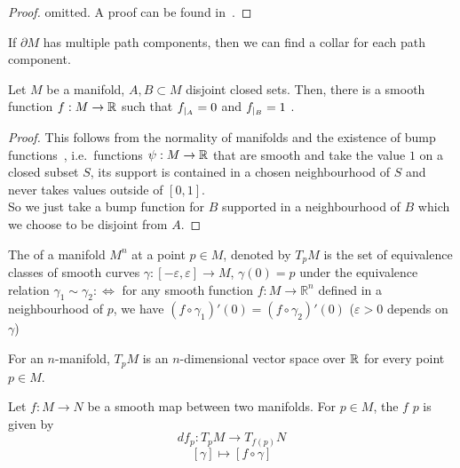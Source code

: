 \documentclass[a4paper,11pt]{article}
\begin{document}
\begin{proof}
    omitted. A proof can be found in\ \cite{lee}.
\end{proof}

\begin{observation}
    If \(\partial M\) has multiple path components, then we can find a collar for each path component.
\end{observation}

\begin{theorem}\label{urysohn}
    Let \(M\) be a manifold, \(A,B\subset M\) disjoint closed sets. Then, there is a smooth function \(f:M\to\mathbb{R}\) such that \(f_{|_{A}}=0\) and \(f_{|_{B}}=1\)
.
\end{theorem}

\begin{proof}
    This follows from the normality of manifolds and the existence of bump functions\ \cite[Proposition 2.25]{lee}, i.e.\ functions \(\psi:M\to\mathbb{R}\) that are smooth and take the value \(1\) on a closed subset \(S\), its support is contained in a chosen neighbourhood of \(S\) and never takes values outside of \([0,1]\).\\
    So we just take a bump function for \(B\) supported in a neighbourhood of \(B\) which we choose to be disjoint from \(A\).
\end{proof}

\begin{definition}
    The  of a manifold \(M^n\) at a point \(p\in M\), denoted by \(T_p M\) is the set of equivalence classes of smooth curves \(\gamma:[-\varepsilon,\varepsilon]\to M\), \(\gamma(0)=p\) under the equivalence relation \(\gamma_1\sim\gamma_2:\Leftrightarrow\) for any smooth function \(f:M\to\mathbb{R}^n\) defined in a neighbourhood of \(p\), we have \((f\circ\gamma_1)'(0)=(f\circ\gamma_2)'(0)\) (\(\varepsilon>0\) depends on \(\gamma\))
\end{definition}

\begin{remark}\cite[Proposition 3.10]{lee}
    For an \(n\)-manifold, \(T_p M\) is an \(n\)-dimensional vector space over \(\mathbb{R}\) for every point \(p\in M\).
\end{remark}

\begin{definition}
    Let \(f:M\to N\) be a smooth map between two manifolds. For \(p\in M\), the  \(f\)  \(p\) is given by
    \[df_p:T_p M\to T_{f(p)}N\]
    \[[\gamma]\mapsto[f\circ \gamma]\]
\end{definition}
\end{document}

